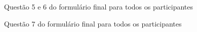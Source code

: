 \documentclass[english,brazilian]{UNISINOSartigo} %
\begin{document}
\begin{figure}[ht]
    \caption{Questão 5 e 6 do formulário final para todos os participantes}
    \label{fig:questao5_6_geral}
    \centering
    \footnotesize
    \begin{minipage}{.9\textwidth}
        \centering
    \end{minipage}
\end{figure}
\FloatBarrier

\begin{figure}[ht]
    \caption{Questão 7 do formulário final para todos os participantes}
    \label{fig:questao7_geral}
    \centering
    \footnotesize
    \begin{minipage}{.9\textwidth}
        \centering
    \end{minipage}
\end{figure}
\FloatBarrier
\end{document}
